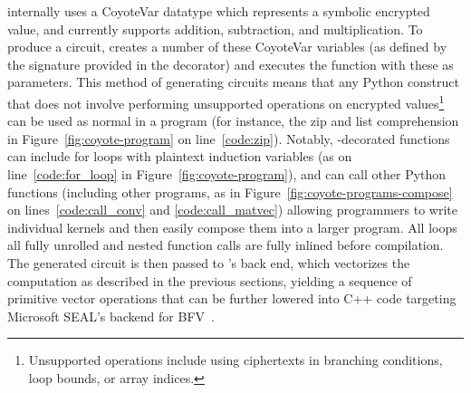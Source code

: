 \system internally uses a {\sf CoyoteVar} datatype which represents a symbolic encrypted value, and currently supports addition, subtraction, and multiplication.
To produce a circuit, \system creates a number of these {\sf CoyoteVar} variables (as defined by the signature provided in the decorator) and executes the function with these as parameters.
This method of generating circuits means that any Python construct that does not involve performing unsupported operations on encrypted values\footnote{Unsupported operations include using ciphertexts in branching conditions, loop bounds, or array indices.} can be used as normal in a \system program (for instance, the {\sf zip} and list comprehension in Figure~\ref{fig:coyote-program} on line~\ref{code:zip}).
Notably, \system-decorated functions can include for loops with plaintext induction variables (as on line~\ref{code:for_loop} in Figure~\ref{fig:coyote-program}), and can call other Python functions (including other \system programs, as in Figure~\ref{fig:coyote-programs-compose} on lines~\ref{code:call_conv} and \ref{code:call_matvec}) allowing programmers to write individual kernels and then easily compose them into a larger program.
All loops all fully unrolled and nested function calls are fully inlined before compilation.
The generated circuit is then passed to \system's back end, which vectorizes the computation as described in the previous sections, yielding a sequence of primitive vector operations that can be further lowered into C++ code targeting Microsoft SEAL's backend for BFV~\cite{seal}.







